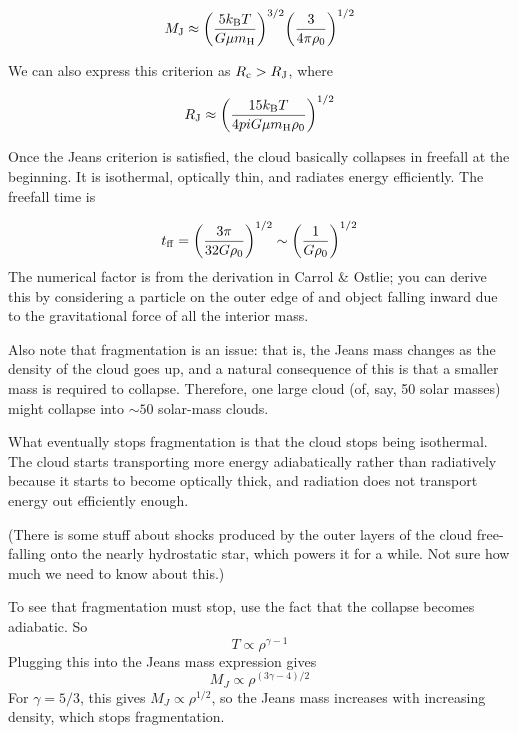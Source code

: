 \begin{equation}
M_{\rm J} \approx \biggl( \frac{5 k_{\rm B}T}{G \mu m_{\rm H}}\biggr)^{3/2}\biggl( \frac{3}{4\pi\rho_0}\biggr)^{1/2}
\end{equation}

We can also express this criterion as $R_{\rm c} > R_{\rm J}$, where

\begin{equation}
R_{\rm J} \approx \biggl( \frac{15 k_{\rm B} T}{4 pi G \mu m_{\rm H} \rho_0} \biggr)^{1/2}
\end{equation}

Once the Jeans criterion is satisfied, the cloud basically collapses in freefall at the beginning. It is isothermal, optically thin, and radiates energy efficiently. The freefall time is

\begin{equation}
t_{\rm ff} = \biggl( \frac{3 \pi}{32 G \rho_0}\biggr)^{1/2} \sim \biggl( \frac{1}{G \rho_0}\biggr)^{1/2}
\end{equation}
The numerical factor is from the derivation in Carrol \& Ostlie; you can derive this by considering a particle on the outer edge of and object falling inward due to the gravitational force of all the interior mass.

Also note that fragmentation is an issue: that is, the Jeans mass changes as the density of the cloud goes up, and a natural consequence of this is that a smaller mass is required to collapse. Therefore, one large cloud (of, say, 50 solar masses) might collapse into $\sim 50$ solar-mass clouds.

What eventually stops fragmentation is that the cloud stops being isothermal. The cloud starts transporting more energy adiabatically rather than radiatively because it starts to become optically thick, and radiation does not transport energy out efficiently enough.

(There is some stuff about shocks produced by the outer layers of the cloud free-falling onto the nearly hydrostatic star, which powers it for a while. Not sure how much we need to know about this.)

To see that fragmentation must stop, use the fact that the collapse becomes 
adiabatic.  So
\begin{equation}
T\propto\rho^{\gamma-1}
\end{equation}
Plugging this into the Jeans mass expression gives
\begin{equation}
M_J\propto\rho^{(3\gamma-4)/2}
\end{equation}
For $\gamma=5/3$, this gives $M_J\propto\rho^{1/2}$, so the Jeans mass 
increases with increasing density, which stops fragmentation.

